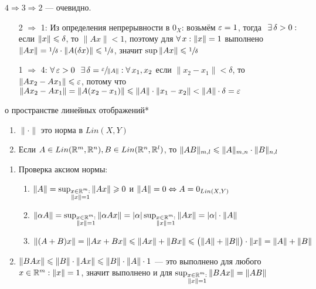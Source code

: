 \begin{prf}
	$4 \Rightarrow 3 \Rightarrow 2$ --- очевидно.
	\begin{itemize}[leftmargin=55pt]
		\item[2 $\Rightarrow$ 1:]  
		Из определения непрерывности в $0_X$: возьмём $\varepsilon = 1$, тогда$\E \delta > 0 :{}$если $\|x\| \leqslant \delta$, то $\|Ax\| < 1$, поэтому для $\forall \, x : \|x\| = 1$ выполнено $\|Ax\| = \sfrac{1}{\delta} \cdot \|A (\delta x)\| \leqslant \sfrac{1}{\delta}$, значит $\sup\|Ax\| \leqslant \sfrac{1}{\delta}$\medskip
		
		\item[1 $\Rightarrow$ 4:] $\A \eps > 0 \E \delta = \sfrac{\eps}{\|A\|} : \A x_1, x_2$ если $\|x_2 - x_1\| < \delta$, то $\|Ax_2 - Ax_1\| \leqslant \varepsilon$, потому что $\|Ax_2 - Ax_1\| = \|A(x_2 - x_1)\| \leqslant \|A\| \cdot \|x_1 - x_2\| < \|A\| \cdot \delta = \varepsilon$
	\end{itemize}
\end{prf}
\vspace{-15pt}
\begin{teor}[https://youtu.be/OazzLm0DJN4?si=rQwhPft7RLfNzztG&t=2414]{о пространстве линейных отображений}*
	\vspace{-15pt}
	\begin{enumerate}\makeatletter\renewcommand{\p@enumi}{т.~\theteor.}\makeatother 
		\item $\|\cdot\|$ это норма в $Lin(X, Y)$
		
		\item\label{оц.норм} Если $A \in Lin(\mathbb R^m, \mathbb R^n), B \in Lin(\mathbb R^n, \mathbb R^l)$, то $\|AB\|_{m,l} \leqslant \|A\|_{m, n} \cdot \|B\|_{n,l}$
	\end{enumerate}
\end{teor}

\begin{prf}
	\begin{enumerate}
		\item Проверка аксиом нормы:
		\begin{enumerate}
		\item $\|A\| = \sup_{\substack{x \in \mathbb R^m : \\ \|x\| = 1}} \|Ax\| \geqslant 0$ и $\|A\| = 0 \Leftrightarrow A = 0_{Lin(X, Y)}$
		
		\item $\|\alpha A\| = \sup_{\substack{x \in \mathbb R^m: \\ \|x\| = 1}} \|\alpha Ax\| = |\alpha| \sup_{\substack{x \in \mathbb R^m: \\ \|x\| = 1}} \|Ax\| = |\alpha| \cdot \|A\|$
		
		\item $\|(A + B)x\| = \|Ax + Bx\| \leqslant \|Ax\| + \|Bx\| \leqslant \bigl(\|A\| + \|B\|\bigr) \cdot \|x\| = \|A\| + \|B\|$
		\end{enumerate}
		
	\item $\|BAx\| \leqslant \|B\|\cdot \|Ax\| \leqslant \|B\| \cdot \|A\|\cdot 1$ --- это выполнено для любого $x \in \mathbb R^m : \|x\| = 1$, значит выполнено и для $\sup_{\substack{x \in \mathbb R^m: \\ \|x\| = 1}}\|BAx\| = \|AB\|$  
	\end{enumerate}
\end{prf}

